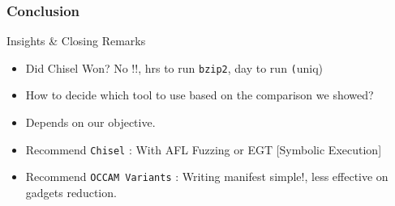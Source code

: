 \documentclass[9pt]{beamer}
\begin{document}
\begin{frame}
	\frametitle{Conclusion}
	\begin{block}{Insights \& Closing Remarks}
		\begin{itemize}
			\pause
			\item Did Chisel Won? \pause No !!,  hrs to run \texttt{bzip2},  day to run \texttt(uniq)
			\pause
			\item How to decide which tool to use based on the comparison we showed?
			\pause
			\item Depends on our objective. 
			\pause
			\item Recommend \texttt{Chisel} : With AFL Fuzzing or EGT [Symbolic Execution]
			\pause
			\item Recommend \texttt{OCCAM Variants} : Writing manifest simple!, less effective on gadgets reduction.
		\end{itemize}
	\end{block}
\end{frame}
\end{document}

